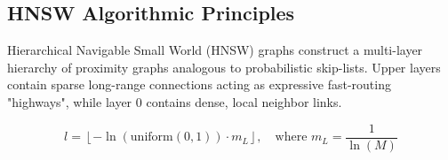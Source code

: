 \documentclass[11pt,a4paper]{article}
\begin{document}
\subsection{HNSW Algorithmic Principles}
Hierarchical Navigable Small World (HNSW) graphs construct a multi-layer hierarchy of proximity graphs analogous to probabilistic skip-lists. Upper layers contain sparse long-range connections acting as expressive fast-routing "highways", while layer $0$ contains dense, local neighbor links.

\begin{equation}
    l = \left\lfloor -\ln(\text{uniform}(0, 1)) \cdot m_L \right\rfloor, \quad \text{where } m_L = \frac{1}{\ln(M)}
\end{equation}

\end{document}
